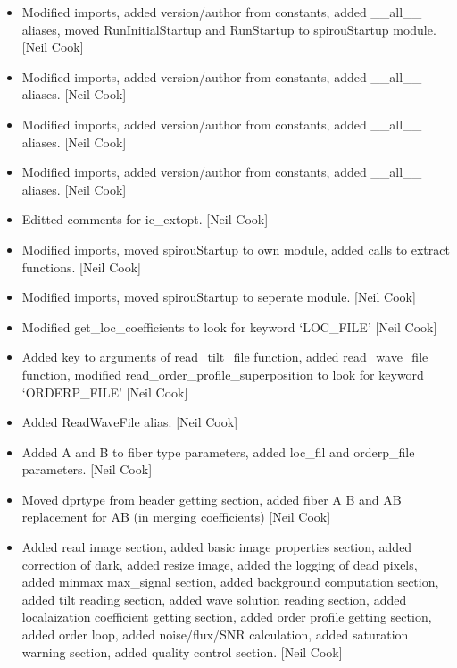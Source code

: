 \documentclass[a4paper,10pt,english]{report}
\begin{document}
\begin{itemize}
\item {} 
Modified imports, added version/author from constants, added \_\_all\_\_
aliases, moved RunInitialStartup and RunStartup to spirouStartup
module. {[}Neil Cook{]}

\item {} 
Modified imports, added version/author from constants, added \_\_all\_\_
aliases. {[}Neil Cook{]}

\item {} 
Modified imports, added version/author from constants, added \_\_all\_\_
aliases. {[}Neil Cook{]}

\item {} 
Modified imports, added version/author from constants, added \_\_all\_\_
aliases. {[}Neil Cook{]}

\item {} 
Editted comments for ic\_extopt. {[}Neil Cook{]}

\item {} 
Modified imports, moved spirouStartup to own module, added calls to
extract functions. {[}Neil Cook{]}

\item {} 
Modified imports, moved spirouStartup to seperate module. {[}Neil Cook{]}

\item {} 
Modified get\_loc\_coefficients to look for keyword ‘LOC\_FILE’ {[}Neil
Cook{]}

\item {} 
Added key to arguments of read\_tilt\_file function, added
read\_wave\_file function, modified read\_order\_profile\_superposition to
look for keyword ‘ORDERP\_FILE’ {[}Neil Cook{]}

\item {} 
Added ReadWaveFile alias. {[}Neil Cook{]}

\item {} 
Added A and B to fiber type parameters, added loc\_fil and orderp\_file
parameters. {[}Neil Cook{]}

\item {} 
Moved dprtype from header getting section, added fiber A B and AB
replacement for AB (in merging coefficients) {[}Neil Cook{]}

\item {} 
Added read image section, added basic image properties section, added
correction of dark, added resize image, added the logging of dead
pixels, added minmax max\_signal section, added background computation
section, added tilt reading section, added wave solution reading
section, added localaization coefficient getting section, added order
profile getting section, added order loop, added noise/flux/SNR
calculation, added saturation warning section, added quality control
section. {[}Neil Cook{]}

\end{itemize}
\end{document}
